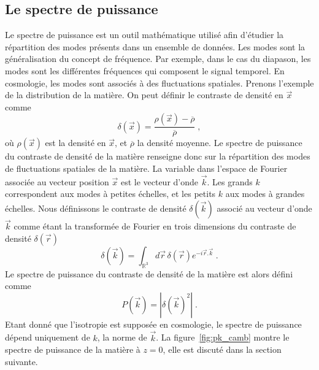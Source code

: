 \subsection{Le spectre de puissance}
Le spectre de puissance est un outil mathématique utilisé afin d'étudier la répartition des modes présents dans un ensemble de données. Les modes sont la généralisation du concept de fréquence. Par exemple, dans le cas du diapason, les modes sont les différentes fréquences qui composent le signal temporel. En cosmologie, les modes sont associés à des fluctuations spatiales. Prenons l'exemple de la distribution de la matière. On peut définir le contraste de densité en $\vec x$ comme
\begin{equation}
  \label{eq:contraste}
  \delta(\vec x) = \frac{\rho(\vec x) - \overline \rho}{\overline\rho}  \; ,
\end{equation}
où $\rho(\vec x)$ est la densité en $\vec x$, et $\overline \rho$ la densité moyenne. Le spectre de puissance du contraste de densité de la matière renseigne donc sur la répartition des modes de fluctuations spatiales de la matière. La variable dans l'espace de Fourier associée au vecteur position $\vec x$ est le vecteur d'onde $\vec k$. Les grands $k$ correspondent aux modes à petites échelles, et les petits $k$ aux modes à grandes échelles.
Nous définissons le contraste de densité $\delta(\vec k)$ associé au vecteur d'onde $\vec k$ comme étant la transformée de Fourier en trois dimensions du contraste de densité $\delta(\vec r)$
\begin{equation}
  \label{eq:delta_k}
  \delta(\vec k) = \int_{\mathbb{R}^{3}} d\vec r \,\delta(\vec r) e^{-i \vec r . \vec k} \; .
\end{equation}
Le spectre de puissance du contraste de densité de la matière est alors défini comme
\begin{equation}
  \label{eq:def_pow_spec}
  P(\vec{k}) = | \delta(\vec k)^{2} |  \; .
\end{equation}
Etant donné que l'isotropie est supposée en cosmologie, le spectre de puissance dépend uniquement de $k$, la norme de $\vec{k}$. La figure~\ref{fig:pk_camb} montre le spectre de puissance de la matière à $z=0$, elle est discuté dans la section suivante.

